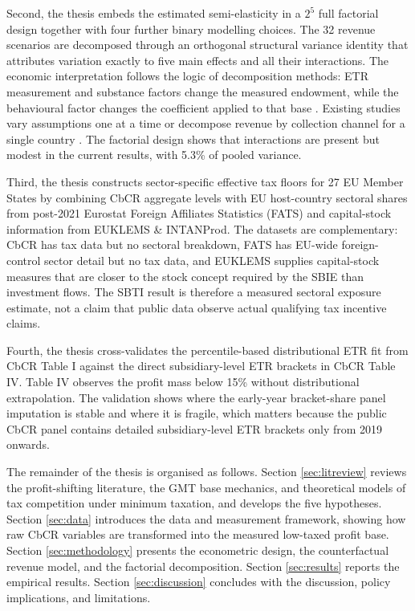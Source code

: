 \documentclass[11pt,a4paper]{article}
\begin{document}
Second, the thesis embeds the estimated semi-elasticity in a $2^5$ full factorial design together with four further binary modelling choices. The 32 revenue scenarios are decomposed through an orthogonal structural variance identity that attributes variation exactly to five main effects and all their interactions. The economic interpretation follows the logic of decomposition methods: ETR measurement and substance factors change the measured endowment, while the behavioural factor changes the coefficient applied to that base \citep{oaxaca1973,blinder1973,shorrocks2013}. Existing studies vary assumptions one at a time \citep{barake2022,hugger2026} or decompose revenue by collection channel for a single country \citep{boukal2026}. The factorial design shows that interactions are present but modest in the current results, with 5.3\% of pooled variance.

Third, the thesis constructs sector-specific effective tax floors for 27 EU Member States by combining CbCR aggregate levels with EU host-country sectoral shares from post-2021 Eurostat Foreign Affiliates Statistics (FATS) and capital-stock information from EUKLEMS \& INTANProd. The datasets are complementary: CbCR has tax data but no sectoral breakdown, FATS has EU-wide foreign-control sector detail but no tax data, and EUKLEMS supplies capital-stock measures that are closer to the stock concept required by the SBIE than investment flows. The SBTI result is therefore a measured sectoral exposure estimate, not a claim that public data observe actual qualifying tax incentive claims.

Fourth, the thesis cross-validates the percentile-based distributional ETR fit from CbCR Table I against the direct subsidiary-level ETR brackets in CbCR Table IV\@. Table IV observes the profit mass below 15\% without distributional extrapolation. The validation shows where the early-year bracket-share panel imputation is stable and where it is fragile, which matters because the public CbCR panel contains detailed subsidiary-level ETR brackets only from 2019 onwards.

The remainder of the thesis is organised as follows. Section \ref{sec:litreview} reviews the profit-shifting literature, the GMT base mechanics, and theoretical models of tax competition under minimum taxation, and develops the five hypotheses. Section \ref{sec:data} introduces the data and measurement framework, showing how raw CbCR variables are transformed into the measured low-taxed profit base. Section \ref{sec:methodology} presents the econometric design, the counterfactual revenue model, and the factorial decomposition. Section \ref{sec:results} reports the empirical results. Section \ref{sec:discussion} concludes with the discussion, policy implications, and limitations.
\end{document}
